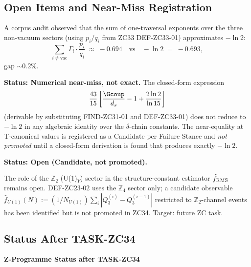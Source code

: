 \documentclass[12pt, a4paper]{article}
\begin{document}
\subsection{Open Items and Near-Miss Registration}
\label{sec:open}

\begin{openqbox}[title={GAP-ZC34-01: The $-\ln 2$ Traversal Sum
  (Numerical Near-Miss)}]
A corpus audit observed that the sum of one-traversal
exponents over the three non-vacuum sectors (using $p_i/q_i$
from ZC33 DEF-ZC33-01) approximates $-\ln 2$:
\[
  \sum_{i \neq \text{vac}} \Gamma_i \cdot \frac{p_i}{q_i}
  \;\approx\; -0.694
  \quad\text{vs}\quad
  -\ln 2 \;=\; -0.693,
\]
gap $\sim 0.2\%$.

\medskip
\textbf{Status: Numerical near-miss, not exact.}
The closed-form expression
\[
  \frac{43}{15}\left[\frac{\Gcoup}{d_s} - 1 + \frac{2\ln 2}{\ln 15}\right]
\]
(derivable by substituting FIND-ZC31-01 and DEF-ZC33-01) does
not reduce to $-\ln 2$ in any algebraic identity over the
$\delta$-chain constants. The near-equality at T-canonical
values is registered as a Candidate per Failure Stance and
\emph{not promoted} until a closed-form derivation is found
that produces exactly $-\ln 2$.

\medskip
\textbf{Status: Open (Candidate, not promoted).}
\end{openqbox}

\begin{openqbox}[title={Open-ZC23-U1 (unchanged): U(1)$_Y$ Role
  in $\hat{f}_{\rm RMS}$}]
The role of the $\mathbb{Z}_2$ (U(1)$_Y$) sector in the
structure-constant estimator $\hat{f}_{\rm RMS}$ remains open.
DEF-ZC23-02 uses the $\mathbb{Z}_4$ sector only; a candidate
observable
$\hat{f}_{U(1)}(N) := (1/N_{U(1)})\sum_i |Q_3^{(i)} - Q_3^{(i-1)}|$
restricted to $\mathbb{Z}_2$-channel events has been identified
but is not promoted in ZC34. Target: future ZC task.
\end{openqbox}

\subsection{Status After TASK-ZC34}
\label{sec:status}

{\small\color{crfgreen!20!black}\bfseries Z-Programme Status
after TASK-ZC34}
\vspace{2pt}
\end{document}
